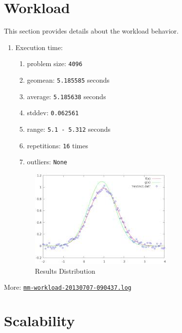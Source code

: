 \documentclass[a4paper]{article}
\begin{document}
\section{Workload}

This section provides details about the workload behavior.

\begin{enumerate}
\item Execution time:
\begin{enumerate}
\item problem size: {\tt 4096}
\item geomean: {\tt 5.185585} seconds
\item average: {\tt 5.185638} seconds
\item stddev: {\tt 0.062561}
\item range: {\tt 5.1 - 5.312} seconds
\item repetitions: {\tt 16} times
\item outliers: {\tt None}
\end{enumerate}

\begin{figure}[H]
\label{fig:normal}
\centering
\includegraphics[width=\textwidth]{normal.jpg}
\caption{Results Distribution}
\end{figure}

\end{enumerate}

More: \href{TBD}{\tt mm-workload-20130707-090437.log}

\section{Scalability}
\end{document}
